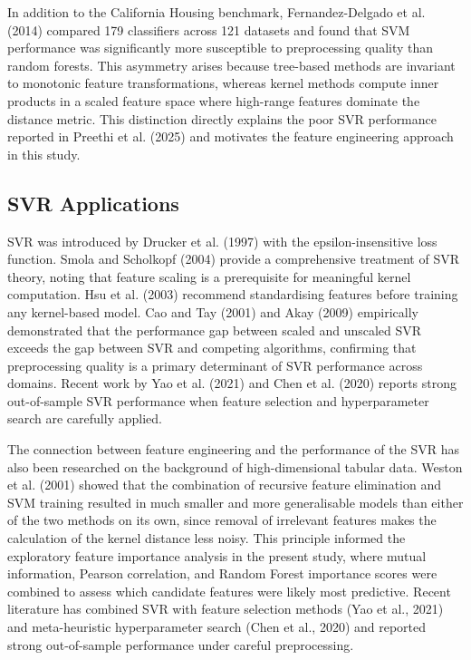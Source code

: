 \documentclass[pdflatex,sn-mathphys-num]{sn-jnl}
\begin{document}
In addition to the California Housing benchmark, Fernandez-Delgado et al. (2014) compared 179 classifiers across 121 datasets and found that SVM performance was significantly more susceptible to preprocessing quality than random forests. This asymmetry arises because tree-based methods are invariant to monotonic feature transformations, whereas kernel methods compute inner products in a scaled feature space where high-range features dominate the distance metric. This distinction directly explains the poor SVR performance reported in Preethi et al. (2025) and motivates the feature engineering approach in this study.

\subsection{SVR Applications}
SVR was introduced by Drucker et al. (1997) with the epsilon-insensitive loss function. Smola and Scholkopf (2004) provide a comprehensive treatment of SVR theory, noting that feature scaling is a prerequisite for meaningful kernel computation. Hsu et al. (2003) recommend standardising features before training any kernel-based model. Cao and Tay (2001) and Akay (2009) empirically demonstrated that the performance gap between scaled and unscaled SVR exceeds the gap between SVR and competing algorithms, confirming that preprocessing quality is a primary determinant of SVR performance across domains. Recent work by Yao et al. (2021) and Chen et al. (2020) reports strong out-of-sample SVR performance when feature selection and hyperparameter search are carefully applied.

The connection between feature engineering and the performance of the SVR has also been researched on the background of high-dimensional tabular data. Weston et al. (2001) showed that the combination of recursive feature elimination and SVM training resulted in much smaller and more generalisable models than either of the two methods on its own, since removal of irrelevant features makes the calculation of the kernel distance less noisy. This principle informed the exploratory feature importance analysis in the present study, where mutual information, Pearson correlation, and Random Forest importance scores were combined to assess which candidate features were likely most predictive. Recent literature has combined SVR with feature selection methods (Yao et al., 2021) and meta-heuristic hyperparameter search (Chen et al., 2020) and reported strong out-of-sample performance under careful preprocessing.
\end{document}
